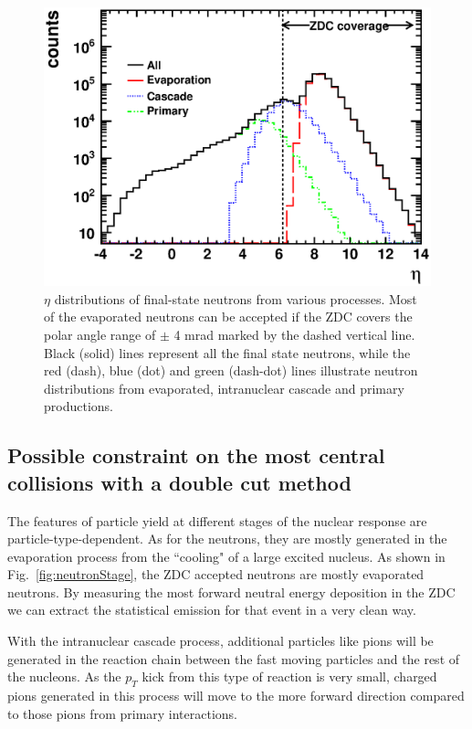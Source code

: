 \begin{figure}
\begin{center}
\includegraphics[width=1.0\columnwidth]{plots/chpt7/neutron_ZDC_cuts.eps}
\caption[$\eta$ distribution for all final-state neutrons in a \eA\ collision]{$\eta$ distributions of final-state neutrons from various processes. Most of the evaporated neutrons can be accepted
if the ZDC covers the polar angle range of $\pm$ 4 mrad marked by the
dashed vertical line. Black (solid) lines represent all the final state
neutrons, while the red (dash), blue (dot) and green (dash-dot) lines illustrate neutron distributions
from evaporated, intranuclear cascade and primary productions.}
\label{fig:neutronZDC}
\end{center}
\end{figure}



\subsection{Possible constraint on the most central collisions with a double cut method}

The features of particle yield at different stages of the nuclear response
are particle-type-dependent. As for the neutrons, they are mostly generated
in the evaporation process from the ``cooling" of a large excited nucleus.
As shown in Fig.~\ref{fig:neutronStage}, the ZDC accepted
neutrons are mostly evaporated neutrons. By measuring the most forward
neutral energy deposition in the ZDC we can extract the statistical emission
for that event in a very clean way.

With the intranuclear cascade process, additional particles like pions
will be generated in the reaction chain between the fast moving particles
and the rest of the nucleons.
As the $p_{T}$ kick from this type of reaction is very small, charged pions
generated in this process will move to the more forward direction compared
to those pions from primary interactions.


